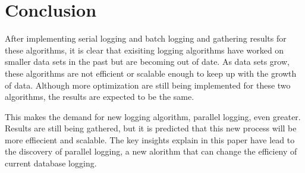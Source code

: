 \section{Conclusion}
After implementing serial logging and batch logging and gathering results for these algorithms, it is clear that exisiting logging algorithms have worked on smaller data sets in the past but are becoming out of date. As data sets grow, these algorithms are not efficient or scalable enough to keep up with the growth of data. Although more optimization are still being implemented for these two algorithms, the results are expected to be the same. \par

This makes the demand for new logging algorithm, parallel logging, even greater. Results are still being gathered, but it is predicted that this new process will be more effiecient and scalable. The key insights explain in this paper have lead to the discovery of parallel logging, a new alorithm that can change the efficieny of current database logging. 
  

